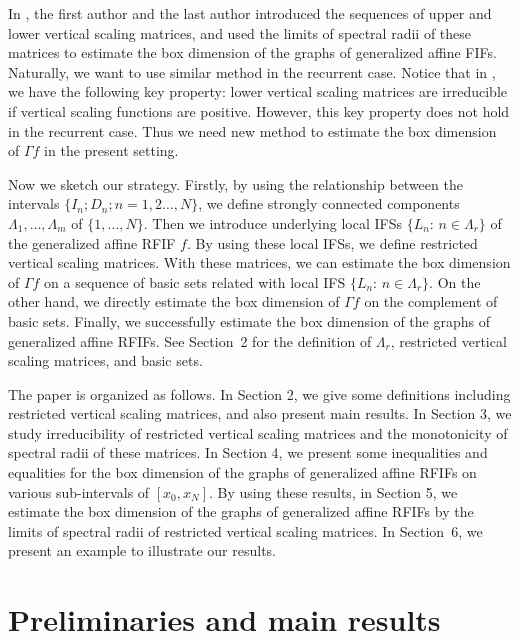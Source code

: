 \documentclass[11pt]{amsart}
\theoremstyle{definition}
\theoremstyle{remark}
\numberwithin{equation}{section}
\begin{document}
In \cite{JR23, JR24}, the first author and the last author introduced the sequences of upper and lower vertical scaling matrices, and used the limits of spectral radii of these matrices to estimate the box dimension of the graphs of generalized affine FIFs. 
Naturally, we want to use similar method in the recurrent case. Notice that in \cite{JR23,JR24}, we have the following key property: lower vertical scaling matrices are irreducible if vertical scaling functions are positive. However, this key property does not hold in the recurrent case. Thus we need new method to estimate the box dimension of $\Gamma f$ in the present setting.

Now we sketch our strategy. Firstly, by using the relationship between the intervals $\{I_n;D_n;n=1,2\ldots,N\}$, we define strongly connected components $\Lambda_1,\ldots,\Lambda_m$ of $\{1,\ldots,N\}$. Then we introduce underlying local IFSs $\{L_n:\, n\in \Lambda_r\}$ of the generalized affine RFIF $f$. By using these local IFSs, we define restricted vertical scaling matrices. With these matrices, we can estimate the box dimension of $\Gamma f$ on a sequence of basic sets related with local IFS $\{L_n:\, n\in \Lambda_r\}$. On the other hand, we directly estimate the box dimension of $\Gamma f$ on the complement of basic sets. 
Finally, we successfully estimate the box dimension of the graphs of generalized affine RFIFs. See Section~2 for the definition of $\Lambda_r$, restricted vertical scaling matrices, and basic sets.



 The paper is organized as follows. 
 In Section 2, we give some definitions including restricted vertical scaling matrices, and also present main results. 
 In Section 3, we study irreducibility of restricted vertical scaling matrices and the monotonicity of spectral radii of these matrices. In Section 4, we present some inequalities and equalities for the box dimension of the graphs of generalized affine RFIFs on various sub-intervals of $[x_0,x_N]$. By using these results, in Section 5, we estimate the box dimension of the graphs of generalized affine RFIFs by the limits of spectral radii of restricted vertical scaling matrices. In Section~6, we present an example to illustrate our results. 



\section{Preliminaries and main results}
\end{document}
